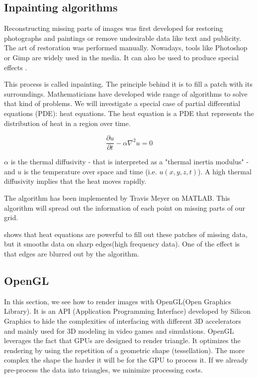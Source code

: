 \subsection{Inpainting algorithms}

Reconstructing missing parts of images was first developed for restoring photographs and paintings or remove undesirable data like text and publicity. The art of restoration was performed manually. Nowadays, tools like Photoshop or Gimp are widely used in the media. It can also be used to produce special effects \cite{richard2001fast}.

This process is called inpainting. The principle behind it is to fill a patch with its surroundings. Mathematicians have developed wide range of algorithms to solve that kind of problems. We will investigate a special case of partial differential equations (PDE): heat equations. 
The heat equation is a PDE that represents the distribution of heat in a region over time. 

\begin{equation}\label{eqn:heateq}
\frac{\partial u}{\partial t} - \alpha \nabla^2 u = 0
\end{equation}

$\alpha$ is the thermal diffusivity - that is interpreted as a "thermal inertia modulus" - and $u$ is the temperature over space and time (i.e. $u(x,y,z,t)$). A high thermal diffusivity implies that the heat moves rapidly.

The algorithm has been implemented by Travis Meyer on MATLAB. This algorithm will spread out the information of each point on missing parts of our grid.

\cite{aubert2006mathematical} shows that heat equations are powerful to fill out these patches of missing data, but it smooths data on sharp edges(high frequency data). One of the effect is that edges are blurred out by the algorithm.


\subsection{OpenGL}

In this section, we see how to render images with OpenGL(Open Graphics Library). It is an API (Application Programming Interface) developed by Silicon Graphics to hide the complexities of interfacing with different 3D accelerators and mainly used for 3D modeling in video games and simulations. OpenGL leverages the fact that GPUs are designed to render triangle. It optimizes the rendering by using the repetition of a geometric shape (tessellation). The more complex the shape the harder it will be for the GPU to process it. If we already pre-process the data into triangles, we minimize processing costs. \cite{abobegpu}

